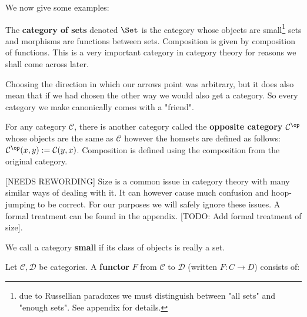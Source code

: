 We now give some examples:

\begin{example}
	The \textbf{category of sets} denoted $\Set$ is the category whose objects are small\footnote{due to Russellian paradoxes we must distinguish between "all sets" and "enough sets". See appendix for details. } sets and morphisms are functions between sets. Composition is given by composition of functions. This is a very important category in category theory for reasons we shall come across later.
\end{example}

Choosing the direction in which our arrows point was arbitrary, but it does also mean that if we had chosen the other way we would also get a category. So every category we make canonically comes with a "friend".

\begin{example}
	For any category $\mathcal{C}$, there is another category called the {\bf opposite category} $\mathcal{C}^\op$ whose objects are the same as $\mathcal{C}$ however the homsets are defined as follows: $\mathcal{C}^\op(x,y):=\mathcal{C}(y,x)$. Composition is defined using the composition from the original category.
\end{example}

[NEEDS REWORDING]
Size is a common issue in category theory with many similar ways of dealing with it. It can however cause much confusion and hoop-jumping to be correct. For our purposes we will safely ignore these issues. A formal treatment can be found in the appendix. [TODO: Add formal treatment of size].

\begin{defin}
	We call a category {\bf small} if its class of objects is really a set.
\end{defin}

\begin{defin}
	Let $\mathcal{C},\mathcal{D}$ be categories. A {\bf functor} $F$ from $\mathcal{C}$ to $\mathcal{D}$ (written $F : C \to D$) consists of:
	
	\begin{itemize}
		\item An object $F(A)\in \mathcal{D}$, for all $A \in \mathcal{C}$ (also denoted $FA$).
		\item For each $A,B \in \mathcal{C}$, a function $F_{A,B} : \mathcal{C}}(A,B) \to \mathcal{D}(FA,FB)$ (also denoted $F$).
		\item For each $A \in \mathcal{C}$, $F(1_A) = 1_{FA}$.
		\item For each $A,B,C \in \mathcal{C}$, $f : A \to B$, $g : B \to C$, we have $$F(g \circ f) = F(g)\circ F(f)$$
	\end{itemize}
\end{defin}

